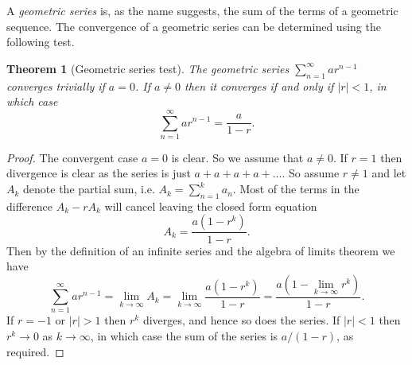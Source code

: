 \documentclass[extrafontsizes, twoside, a4paper]{memoir}
\theoremstyle{plain}%
\newtheorem{thm}{Theorem}[chapter]
\theoremstyle{definition}
\theoremstyle{remark}
\begin{document}
A \emph{geometric series} is, as the name suggests, the sum of the terms of a geometric sequence. The convergence of a geometric series can be determined using the following test.

\begin{thm}[Geometric series test]
The geometric series $\sum_{n=1}^\infty a r^{n-1}$ converges trivially if $a=0$. If $a \neq 0$ then it converges if and only if $|r| < 1$, in which case
$$ \sum_{n=1}^\infty a r^{n-1} = \frac{a}{1-r} .$$
\end{thm}
\begin{proof}
The convergent case $a=0$ is clear. So we assume that $a \neq 0$. If $r=1$ then divergence is clear as the series is just $a+a+a+a+ \dots $. So assume $r \neq 1$ and let $A_k$ denote the partial sum, i.e. $A_k = \sum_{n=1}^k a_n$. Most of the terms in the difference $A_k - rA_k$ will cancel leaving the closed form equation
$$A_k = \frac{a(1 - r^k)}{1-r}.$$
Then by the definition of an infinite series and the algebra of limits theorem we have
$$ \sum_{n=1}^\infty a r^{n-1} = \lim_{k \to \infty} A_k = \lim_{k \to \infty} \frac{a(1 - r^k)}{1-r} = \frac{a(1 - \lim_{k \to \infty} r^k)}{1-r}.$$
If $r = -1$ or $|r| > 1$ then $r^k$ diverges, and hence so does the series. If $|r| < 1$ then $r^k \to 0$ as $k \to \infty$, in which case the sum of the series is $a/(1-r)$, as required.
\end{proof}
\end{document}
